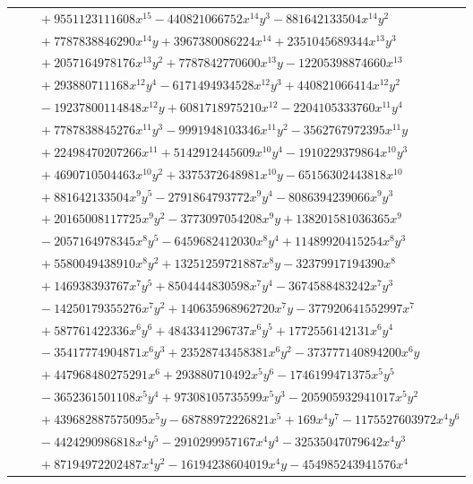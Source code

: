 \documentclass[11pt]{article}
\begin{document}
\begin{longtable}{@{}ll@{}}
 & $\quad +9551123111608x^{15}-440821066752x^{14}y^{3}-881642133504x^{14}y^{2}$\\
 & $\quad +7787838846290x^{14}y+3967380086224x^{14}+2351045689344x^{13}y^{3}$\\
 & $\quad +2057164978176x^{13}y^{2}+7787842770600x^{13}y-12205398874660x^{13}$\\
 & $\quad +293880711168x^{12}y^{4}-6171494934528x^{12}y^{3}+440821066414x^{12}y^{2}$\\
 & $\quad -19237800114848x^{12}y+6081718975210x^{12}-2204105333760x^{11}y^{4}$\\
 & $\quad +7787838845276x^{11}y^{3}-9991948103346x^{11}y^{2}-3562767972395x^{11}y$\\
 & $\quad +22498470207266x^{11}+5142912445609x^{10}y^{4}-1910229379864x^{10}y^{3}$\\
 & $\quad +4690710504463x^{10}y^{2}+3375372648981x^{10}y-65156302443818x^{10}$\\
 & $\quad +881642133504x^{9}y^{5}-2791864793772x^{9}y^{4}-8086394239066x^{9}y^{3}$\\
 & $\quad +20165008117725x^{9}y^{2}-3773097054208x^{9}y+138201581036365x^{9}$\\
 & $\quad -2057164978345x^{8}y^{5}-6459682412030x^{8}y^{4}+11489920415254x^{8}y^{3}$\\
 & $\quad +5580049438910x^{8}y^{2}+13251259721887x^{8}y-32379917194390x^{8}$\\
 & $\quad +146938393767x^{7}y^{5}+8504444830598x^{7}y^{4}-3674588483242x^{7}y^{3}$\\
 & $\quad -14250179355276x^{7}y^{2}+140635968962720x^{7}y-377920641552997x^{7}$\\
 & $\quad +587761422336x^{6}y^{6}+4843341296737x^{6}y^{5}+1772556142131x^{6}y^{4}$\\
 & $\quad -35417774904871x^{6}y^{3}+23528743458381x^{6}y^{2}-373777140894200x^{6}y$\\
 & $\quad +447968480275291x^{6}+293880710492x^{5}y^{6}-1746199471375x^{5}y^{5}$\\
 & $\quad -3652361501108x^{5}y^{4}+97308105735599x^{5}y^{3}-205905932941017x^{5}y^{2}$\\
 & $\quad +439682887575095x^{5}y-68788972226821x^{5}+169x^{4}y^{7}-1175527603972x^{4}y^{6}$\\
 & $\quad -4424290986818x^{4}y^{5}-2910299957167x^{4}y^{4}-32535047079642x^{4}y^{3}$\\
 & $\quad +87194972202487x^{4}y^{2}-16194238604019x^{4}y-454985243941576x^{4}$\\

\end{longtable}
\end{document}
